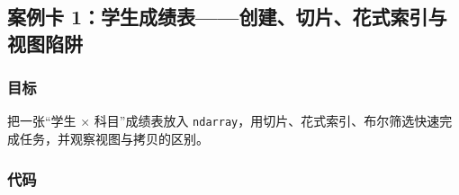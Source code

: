 \subsection{案例卡
1：学生成绩表------创建、切片、花式索引与视图陷阱}\label{ux6848ux4f8bux5361-1ux5b66ux751fux6210ux7ee9ux8868ux521bux5efaux5207ux7247ux82b1ux5f0fux7d22ux5f15ux4e0eux89c6ux56feux9677ux9631}

\subsubsection{目标}\label{ux76eeux6807}

把一张``学生 × 科目''成绩表放入
\texttt{ndarray}，用切片、花式索引、布尔筛选快速完成任务，并观察视图与拷贝的区别。

\subsubsection{代码}\label{ux4ee3ux7801}

